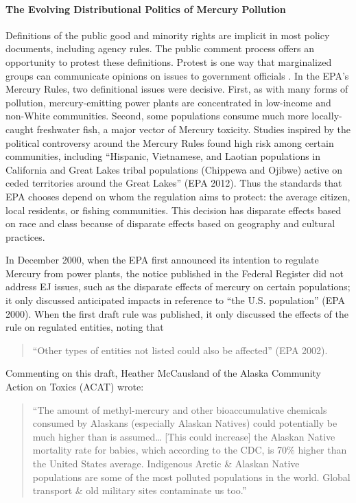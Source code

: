 \documentclass[
      12pt,
        ]{article}
\begin{document}
\hypertarget{the-evolving-distributional-politics-of-mercury-pollution}{%
\paragraph{The Evolving Distributional Politics of Mercury Pollution}\label{the-evolving-distributional-politics-of-mercury-pollution}}

Definitions of the public good and minority rights are
implicit in most policy documents, including agency rules. The public comment process offers an
opportunity to protest these definitions. Protest is one way that
marginalized groups can communicate opinions on issues to government
officials \citep{Gillion2013}. In the EPA's Mercury Rules, two
definitional issues were decisive. First, as with many forms of pollution,
mercury-emitting power plants are concentrated in low-income and
non-White communities. Second, some populations consume much more
locally-caught freshwater fish, a major vector of Mercury toxicity.
Studies inspired by the political controversy around the Mercury Rules
found high risk among certain communities, including ``Hispanic, Vietnamese, and
Laotian populations in California and Great Lakes tribal populations
(Chippewa and Ojibwe) active on ceded territories around the Great
Lakes'' (EPA 2012). Thus the standards that EPA chooses depend on whom the regulation aims to protect: the average citizen,
local residents, or fishing communities. This decision has disparate
effects based on race and class because of disparate effects based on
geography and cultural practices.

In December 2000, when the EPA first announced its intention to regulate
Mercury from power plants, the notice published in the Federal Register
did not address EJ issues, such as the disparate
effects of mercury on certain populations; it only discussed anticipated impacts in
reference to ``the U.S. population'' (EPA 2000). When the first draft rule
was published, it only discussed the effects of the rule on regulated
entities, noting that

\begin{quote}
``Other types of entities not listed could also be
affected'' (EPA 2002).
\end{quote}

Commenting on this draft, Heather McCausland of
the Alaska Community Action on Toxics (ACAT) wrote:

\begin{quote}
``The amount of methyl-mercury and other bioaccumulative chemicals
consumed by Alaskans (especially Alaskan Natives) could potentially be
much higher than is assumed\ldots{} {[}This could increase{]} the Alaskan Native mortality rate for
babies, which according to the CDC, is 70\% higher than the United States
average. Indigenous Arctic \& Alaskan Native populations are some of
the most polluted populations in the world.
Global transport \& old military sites contaminate us too.''
\end{quote}
\end{document}

